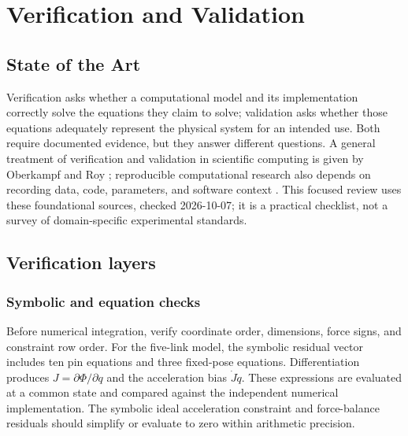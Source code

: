 \documentclass[../main.tex]{subfiles}
\begin{document}
\chapter{Verification and Validation}
\label{chap:verification}

\section{State of the Art}
Verification asks whether a computational model and its implementation correctly solve the equations they claim to solve; validation asks whether those equations adequately represent the physical system for an intended use. Both require documented evidence, but they answer different questions. A general treatment of verification and validation in scientific computing is given by Oberkampf and Roy \cite{oberkampfroy2010}; reproducible computational research also depends on recording data, code, parameters, and software context \cite{sandve2013reproducible}. This focused review uses these foundational sources, checked 2026-10-07; it is a practical checklist, not a survey of domain-specific experimental standards.

\section{Verification layers}
\subsection{Symbolic and equation checks}
Before numerical integration, verify coordinate order, dimensions, force signs, and constraint row order. For the five-link model, the symbolic residual vector includes ten pin equations and three fixed-pose equations. Differentiation produces \(J=\partial\Phi/\partial q\) and the acceleration bias \(\dot J\dot q\). These expressions are evaluated at a common state and compared against the independent numerical implementation. The symbolic ideal acceleration constraint and force-balance residuals should simplify or evaluate to zero within arithmetic precision.
\end{document}
